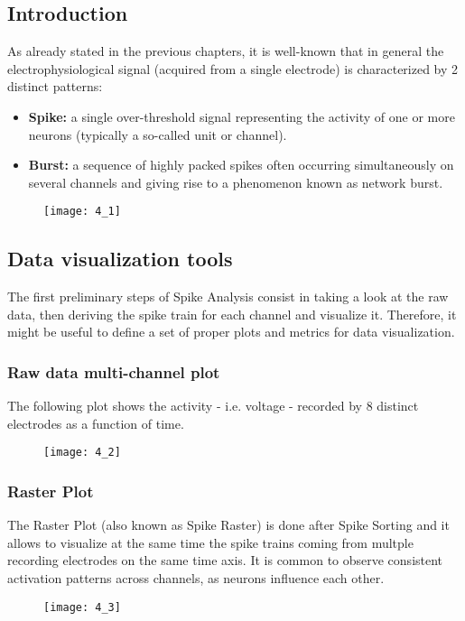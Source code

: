 \subsection{Introduction}
As already stated in the previous chapters, it is well-known that in general the electrophysiological
signal (acquired from a single electrode) is characterized by 2 distinct patterns:
\begin{itemize}
    \item \textbf{Spike:} a single over-threshold signal representing the activity of one or
    more neurons (typically a so-called unit or channel).
    \item \textbf{Burst:} a sequence of highly packed spikes often occurring simultaneously on
    several channels and giving rise to a phenomenon known as network burst.
\end{itemize}
\begin{figure}[H]
    \texttt{[image: 4\_1]}
    \centering
\end{figure}


\subsection{Data visualization tools}
The first preliminary steps of Spike Analysis consist in taking a look at the raw data, then
deriving the spike train for each channel and visualize it. Therefore, it might be useful to define
a set of proper plots and metrics for data visualization.
\subsubsection{Raw data multi-channel plot}
The following plot shows the activity - i.e. voltage - recorded by 8 distinct electrodes as a
function of time.
\begin{figure}[H]
    \texttt{[image: 4\_2]}
    \centering
\end{figure}
\subsubsection{Raster Plot}
The Raster Plot (also known as Spike Raster) is done after Spike Sorting and it allows to visualize
at the same time the spike trains coming from multple recording electrodes on the same time axis.
It is common to observe consistent activation patterns across channels, as neurons influence each
other.
\begin{figure}[H]
    \texttt{[image: 4\_3]}
    \centering
\end{figure}
